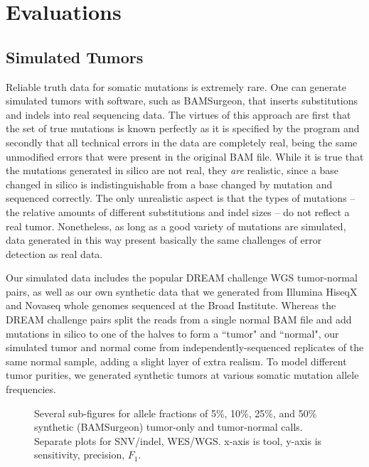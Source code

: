 \documentclass[times, twoside, watermark]{StyleBioRxiv}
\newcommand{\dummyfig}[1]{
  \centering
  \fbox{
    \begin{minipage}[c][0.33\textheight][c]{0.5\textwidth}
      \centering{#1}
    \end{minipage}
  }
}
\begin{document}
\section*{Evaluations}
\subsection*{Simulated Tumors}
Reliable truth data for somatic mutations is extremely rare.  One can generate simulated tumors with software, such as BAMSurgeon\cite{bamsurgeon}, that inserts substitutions and indels into real sequencing data.  The virtues of this approach are first that the set of true mutations is known perfectly as it is specified by the program and secondly that all technical errors in the data are completely real, being the same unmodified errors that were present in the original BAM file.  While it is true that the mutations generated in silico are not real, they \textit{are} realistic, since a base changed in silico is indistinguishable from a base changed by mutation and sequenced correctly.  The only unrealistic aspect is that the types of mutations -- the relative amounts of different substitutions and indel sizes -- do not reflect a real tumor.  Nonetheless, as long as a good variety of mutations are simulated, data generated in this way present basically the same challenges of error detection as real data.

Our simulated data includes the popular DREAM challenge WGS tumor-normal pairs\cite{dream}, as well as our own synthetic data that we generated from Illumina HiseqX and Novaseq whole genomes sequenced at the Broad Institute.  Whereas the DREAM challenge pairs split the reads from a single normal BAM file and add mutations in silico to one of the halves to form a ``tumor" and ``normal", our simulated tumor and normal come from independently-sequenced replicates of the same normal sample, adding a slight layer of extra realism.  To model different tumor purities, we generated synthetic tumors at various somatic mutation allele frequencies.

\begin{figure}[htbp]
  \dummyfig{Placeholder: Synthetic BAM results here}
  \caption{Several sub-figures for allele fractions of 5\%, 10\%, 25\%, and 50\% synthetic (BAMSurgeon) tumor-only and tumor-normal calls.  Separate plots for SNV/indel, WES/WGS.  x-axis is tool, y-axis is sensitivity, precision, $F_1$.}
  \label{fig:placeholder}
\end{figure}
\end{document}
